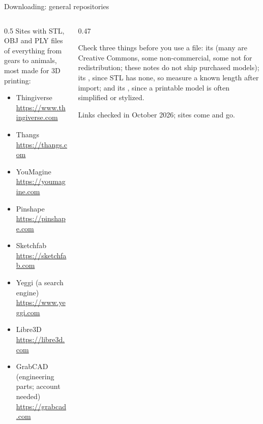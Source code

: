 \documentclass[aspectratio=169,11pt]{beamer}
\begin{document}
\begin{frame}{Downloading: general repositories}
\begin{columns}[T,onlytextwidth]
\begin{column}{0.5\textwidth}
Sites with STL, OBJ and PLY files of everything from gears to animals, most made for 3D printing:
\begin{itemize}
  \item Thingiverse \url{https://www.thingiverse.com}
  \item Thangs \url{https://thangs.com}
  \item YouMagine \url{https://youmagine.com}
  \item Pinshape \url{https://pinshape.com}
  \item Sketchfab \url{https://sketchfab.com}
  \item Yeggi (a search engine) \url{https://www.yeggi.com}
  \item Libre3D \url{https://libre3d.com}
  \item GrabCAD (engineering parts; account needed) \url{https://grabcad.com}
\end{itemize}
\end{column}
\begin{column}{0.47\textwidth}
\begin{punchbox}
\small Check three things before you use a file: its  (many are Creative Commons, some non-commercial, some not for redistribution; these notes do not ship purchased models); its , since STL has none, so measure a known length after import; and its , since a printable model is often simplified or stylized.
\end{punchbox}
\vspace{2mm}
\small Links checked in October 2026; sites come and go.
\end{column}
\end{columns}
\end{frame}
\end{document}
